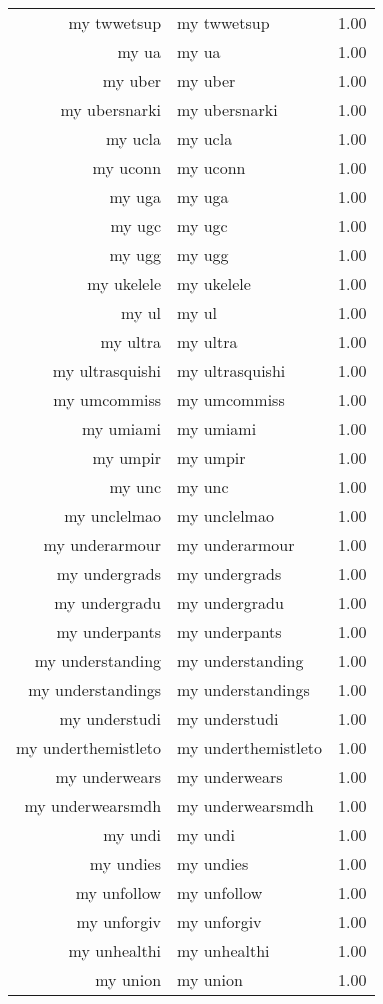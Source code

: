 \begin{table}[ht]
\begin{tabular}{rlr}
  my twwetsup & my twwetsup & 1.00 \\ 
  my ua & my ua & 1.00 \\ 
  my uber & my uber & 1.00 \\ 
  my ubersnarki & my ubersnarki & 1.00 \\ 
  my ucla & my ucla & 1.00 \\ 
  my uconn & my uconn & 1.00 \\ 
  my uga & my uga & 1.00 \\ 
  my ugc & my ugc & 1.00 \\ 
  my ugg & my ugg & 1.00 \\ 
  my ukelele & my ukelele & 1.00 \\ 
  my ul & my ul & 1.00 \\ 
  my ultra & my ultra & 1.00 \\ 
  my ultrasquishi & my ultrasquishi & 1.00 \\ 
  my umcommiss & my umcommiss & 1.00 \\ 
  my umiami & my umiami & 1.00 \\ 
  my umpir & my umpir & 1.00 \\ 
  my unc & my unc & 1.00 \\ 
  my unclelmao & my unclelmao & 1.00 \\ 
  my underarmour & my underarmour & 1.00 \\ 
  my undergrads & my undergrads & 1.00 \\ 
  my undergradu & my undergradu & 1.00 \\ 
  my underpants & my underpants & 1.00 \\ 
  my understanding & my understanding & 1.00 \\ 
  my understandings & my understandings & 1.00 \\ 
  my understudi & my understudi & 1.00 \\ 
  my underthemistleto & my underthemistleto & 1.00 \\ 
  my underwears & my underwears & 1.00 \\ 
  my underwearsmdh & my underwearsmdh & 1.00 \\ 
  my undi & my undi & 1.00 \\ 
  my undies & my undies & 1.00 \\ 
  my unfollow & my unfollow & 1.00 \\ 
  my unforgiv & my unforgiv & 1.00 \\ 
  my unhealthi & my unhealthi & 1.00 \\ 
  my union & my union & 1.00 \\ 

\end{tabular}
\end{table}
